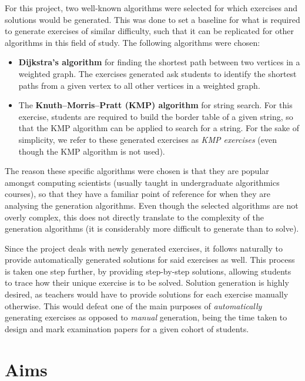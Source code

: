 \documentclass{l4proj}
\begin{document}
For this project, two well-known algorithms were selected for which exercises and solutions would be generated. This was done to set a baseline for what is required to generate exercises of similar difficulty, such that it can be replicated for other algorithms in this field of study. The following algorithms were chosen:
\begin{itemize}
	\item
	\textbf{Dijkstra's algorithm} for finding the shortest path between two vertices in a weighted graph. The exercises generated ask students to identify the shortest paths from a given vertex to all other vertices in a weighted graph.
	\item
	The \textbf{Knuth–Morris–Pratt (KMP) algorithm} for string search. For this exercise, students are required to build the border table of a given string, so that the KMP algorithm can be applied to search for a string. For the sake of simplicity, we refer to these generated exercises as \emph{KMP exercises} (even though the KMP algorithm is not used).
\end{itemize}
The reason these specific algorithms were chosen is that they are popular amongst computing scientists (usually taught in undergraduate algorithmics courses), so that they have a familiar point of reference for when they are analysing the generation algorithms. Even though the selected algorithms are not overly complex, this does not directly translate to the complexity of the generation algorithms (it is considerably more difficult to generate than to solve). 

Since the project deals with newly generated exercises, it follows naturally to provide automatically generated solutions for said exercises as well. This process is taken one step further, by providing step-by-step solutions, allowing students to trace how their unique exercise is to be solved. Solution generation is highly desired, as teachers would have to provide solutions for each exercise manually otherwise. This would defeat one of the main purposes of \emph{automatically} generating exercises as opposed to \emph{manual} generation, being the time taken to design and mark examination papers for a given cohort of students.

\section{Aims}
\label{sec:aim}
\end{document}
